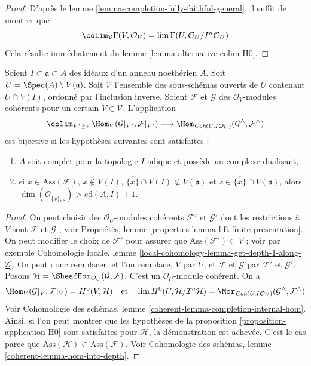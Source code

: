 \begin{proof}
D'après le lemme \ref{lemma-completion-fully-faithful-general},
il suffit de montrer que
$$
\colim_\mathcal{V} \Gamma(V, \mathcal{O}_V) =
\lim \Gamma(U, \mathcal{O}_U/I^n\mathcal{O}_U)
$$
Cela résulte immédiatement du lemme \ref{lemma-alternative-colim-H0}.
\end{proof}

\begin{lemma}
\label{lemma-fully-faithful-very-general}
Soient $I \subset \mathfrak a \subset A$ des idéaux d'un anneau noethérien $A$.
Soit $U = \Spec(A) \setminus V(\mathfrak a)$. Soit $\mathcal{V}$ l'ensemble
des sous-schémas ouverts de $U$ contenant $U \cap V(I)$, ordonné par l'inclusion
inverse. Soient $\mathcal{F}$ et
$\mathcal{G}$ des $\mathcal{O}_V$-modules cohérents pour un certain
$V \in \mathcal{V}$. L'application
$$
\colim_{V' \geq V} \Hom_V(\mathcal{G}|_{V'}, \mathcal{F}|_{V'})
\longrightarrow
\Hom_{\textit{Coh}(U, I\mathcal{O}_U)}(\mathcal{G}^\wedge, \mathcal{F}^\wedge)
$$
est bijective si les hypothèses suivantes sont satisfaites :
\begin{enumerate}
\item $A$ soit complet pour la topologie $I$-adique et possède un complexe dualisant,
\item si $x \in \text{Ass}(\mathcal{F})$, $x \not \in V(I)$,
$\overline{\{x\}} \cap V(I) \not \subset V(\mathfrak a)$
et $z \in \overline{\{x\}} \cap V(\mathfrak a)$, alors
$\dim(\mathcal{O}_{\overline{\{x\}}, z}) > \text{cd}(A, I) + 1$.
\end{enumerate}
\end{lemma}

\begin{proof}
On peut choisir des $\mathcal{O}_U$-modules cohérents
$\mathcal{F}'$ et $\mathcal{G}'$ dont les restrictions à $V$
sont $\mathcal{F}$ et $\mathcal{G}$ ; voir
Propriétés, lemme \ref{properties-lemma-lift-finite-presentation}.
On peut modifier le choix de $\mathcal{F}'$ pour assurer que
$\text{Ass}(\mathcal{F}') \subset V$ ; voir par exemple
Cohomologie locale, lemme \ref{local-cohomology-lemma-get-depth-1-along-Z}.
On peut donc remplacer, et l'on remplace, $V$ par $U$, et $\mathcal{F}$ et $\mathcal{G}$
par $\mathcal{F}'$ et $\mathcal{G}'$.
Posons $\mathcal{H} = \SheafHom_{\mathcal{O}_U}(\mathcal{G}, \mathcal{F})$.
C'est un $\mathcal{O}_U$-module cohérent. On a
$$
\Hom_V(\mathcal{G}|_V, \mathcal{F}|_V) =
H^0(V, \mathcal{H})
\quad\text{et}\quad
\lim H^0(U, \mathcal{H}/\mathcal{I}^n\mathcal{H}) =
\Mor_{\textit{Coh}(U, I\mathcal{O}_U)}
(\mathcal{G}^\wedge, \mathcal{F}^\wedge)
$$
Voir Cohomologie des schémas, lemme \ref{coherent-lemma-completion-internal-hom}.
Ainsi, si l'on peut montrer que les hypothèses de la
proposition \ref{proposition-application-H0}
sont satisfaites pour $\mathcal{H}$, la démonstration est achevée.
C'est le cas parce que
$\text{Ass}(\mathcal{H}) \subset \text{Ass}(\mathcal{F})$.
Voir Cohomologie des schémas, lemme
\ref{coherent-lemma-hom-into-depth}.
\end{proof}








